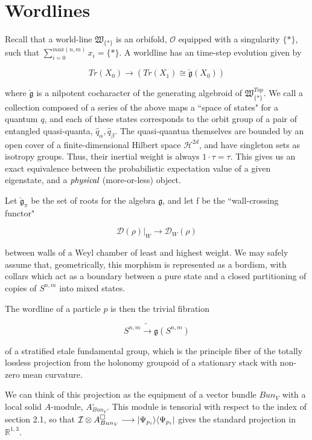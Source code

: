\documentclass{article}
\DeclarePairedDelimiter\bra{\langle}{\rvert}
\DeclarePairedDelimiter\ket{\lvert}{\rangle}
\begin{document}
	\section{Wordlines}
	Recall that a world-line $\mathfrak{W}_{\{\ast\}}$ is an orbifold, $\mathscr{O}$ equipped with a singularity $\{\ast\}$, such that $\sum_{i=0}^{max(n,m)} x_i = \{\ast\}$. A worldline has an time-step evolution given by
	
	$$Tr(X_0) \longrightarrow (Tr(X_1) \cong \breve{\mathfrak{g}}(X_0))$$
	
	where $\breve{\mathfrak{g}}$ is a nilpotent cocharacter of the generating algebroid of $\mathfrak{W}_{\{\ast\}}^{Top}$. We call a collection composed of a series of the above maps a ``space of states" for a quantum $q$, and each of these states corresponds to the orbit group of a pair of entangled quasi-quanta, $\hat{q}_\alpha, \hat{q}_\beta$. The quasi-quantua themselves are bounded by an open cover of a finite-dimensional Hilbert space $\mathcal{H}^{2d}$, and have singleton sets as isotropy groups. Thus, their inertial weight is always $1\cdot \tau=\tau$. This gives us an exact equivalence between the probabilistic expectation value of a given eigenstate, and a $\emph{physical}$ (more-or-less) object.
	
	Let $\breve{\mathfrak{g}}_\pi$ be the set of roots for the algebra $\mathfrak{g}$, and let f be the ``wall-crossing functor"
	
	$$\mathcal{D}(\rho)|_W \longrightarrow \mathcal{D}_W(\rho)$$
	
	between walls of a Weyl chamber of least and highest weight. We may safely assume that, geometrically, this morphism is represented as a bordism, with collars which act as a boundary between a pure state and a closed partitioning of copies of $S^{n,m}$ into mixed states.
	
	The wordline of a particle $p$ is then the trivial fibration 
	
	$$S^{n,m} \widetilde{\longrightarrow} \mathfrak{g}(S^{n,m})$$
	
	of a stratified etale fundamental group, which is the principle fiber of the totally lossless projection from the holonomy groupoid of a stationary stack with non-zero mean curvature.
	
	We can think of this projection as the equipment of a vector bundle $Bun_V$ with a local solid $A$-module, $A_{Bun_V}^\square$. This module is tensorial with respect to the index of section 2.1, so that $\mathcal{I} \otimes A_{Bun_V}^\square \longrightarrow \ket{\Psi_{p_i}} \bra{\Psi_{p_i}}$ gives the standard projection in $\mathbb{R}^{1,3}$.
	
\end{document}
